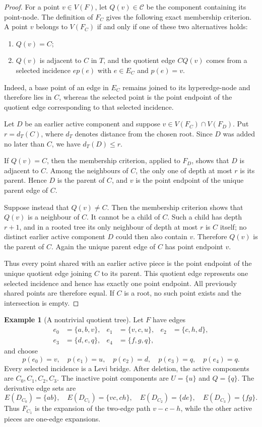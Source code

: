 \documentclass[11pt]{amsart}
\theoremstyle{definition}
\newtheorem{example}[example]{Example}
\theoremstyle{remark}
\numberwithin{equation}{section}
\begin{document}
\begin{proof}
For a point $v\in V(F)$, let $Q(v)\in\mathcal C$ be the component
containing its point-node.  The definition of $F_C$ gives the following exact membership
criterion.  A point $v$ belongs to $V(F_C)$ if and only if one of these
two alternatives holds:
\begin{enumerate}[label=\textup{(\alph*)},leftmargin=2.2em]
\item $Q(v)=C$;
\item $Q(v)$ is adjacent to $C$ in $T$, and the quotient edge $CQ(v)$
comes from a selected incidence $ep(e)$ with $e\in E_C$ and $p(e)=v$.
\end{enumerate}
Indeed, a base point of an edge in $E_C$ remains joined to its
hyperedge-node and therefore lies in $C$, whereas the selected point is
the point endpoint of the quotient edge corresponding to that selected
incidence.

Let $D$ be an earlier active component and suppose
$v\in V(F_C)\cap V(F_D)$.  Put $r=d_T(C)$, where $d_T$ denotes distance
from the chosen root.  Since $D$ was added no later than $C$, we have
$d_T(D)\le r$.

If $Q(v)=C$, then the membership criterion, applied to $F_D$, shows that
$D$ is adjacent to $C$.  Among the neighbours of $C$, the only one of
depth at most $r$ is its parent.  Hence $D$ is the parent of $C$, and
$v$ is the point endpoint of the unique parent edge of $C$.

Suppose instead that $Q(v)\ne C$.  Then the membership criterion shows that
$Q(v)$ is a neighbour of $C$.  It cannot be a child of $C$.  Such a
child has depth $r+1$, and in a rooted tree its only neighbour of depth
at most $r$ is $C$ itself; no distinct earlier active component $D$
could then also contain $v$.  Therefore $Q(v)$ is the parent of $C$.
Again the unique parent edge of $C$ has point endpoint $v$.

Thus every point shared with an earlier active piece is the point
endpoint of the unique quotient edge joining $C$ to its parent.  This
quotient edge represents one selected incidence and hence has exactly
one point endpoint.  All previously shared points are therefore equal.
If $C$ is a root, no such point exists and the intersection is empty.
\end{proof}

\begin{example}[A nontrivial quotient tree]
\label{ex:worked-decomposition}
Let $F$ have edges
\[
\begin{aligned}
 e_0&=\{a,b,v\},& e_1&=\{v,c,u\},& e_2&=\{c,h,d\},\\
 e_3&=\{d,e,q\},& e_4&=\{f,g,q\},
\end{aligned}
\]
and choose
\[
 p(e_0)=v,\quad p(e_1)=u,\quad p(e_2)=d,\quad
 p(e_3)=q,\quad p(e_4)=q.
\]
Every selected incidence is a Levi bridge.  After deletion, the active
components are $C_0,C_1,C_2,C_3$.  The inactive point components are
$U=\{u\}$ and $Q=\{q\}$.  The derivative edge sets are
\[
 E(D_{C_0})=\{ab\},\quad E(D_{C_1})=\{vc,ch\},\quad
 E(D_{C_2})=\{de\},\quad E(D_{C_3})=\{fg\}.
\]
Thus $F_{C_1}$ is the expansion of the two-edge path $v-c-h$, while the
other active pieces are one-edge expansions.
\end{example}
\end{document}
